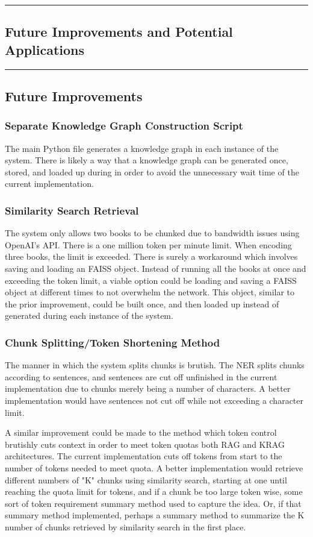 {\color{gray}\hrule}
\begin{center}
\section{Future Improvements and Potential Applications}
\bigskip
\end{center}
{\color{gray}\hrule}

\subsection{Future Improvements}
\subsubsection{Separate Knowledge Graph Construction Script}
The main Python file generates a knowledge graph in each instance of the system. There is likely a way that a knowledge graph can be generated once, stored, and loaded up during in order to avoid the unnecessary wait time of the current implementation.

\subsubsection{Similarity Search Retrieval}
The system only allows two books to be chunked due to bandwidth issues using OpenAI's API. There is a one million token per minute limit. When encoding three books, the limit is exceeded. There is surely a workaround which involves saving and loading an FAISS object. Instead of running all the books at once and exceeding the token limit, a viable option could be loading and saving a FAISS object at different times to not overwhelm the network. This object, similar to the prior improvement, could be built once, and then loaded up instead of generated during each instance of the system.

\subsubsection{Chunk Splitting/Token Shortening Method}
The manner in which the system splits chunks is brutish. The NER splits chunks according to sentences, and sentences are cut off unfinished in the current implementation due to chunks merely being a number of characters. A better implementation would have sentences not cut off while not exceeding a character limit.
\par

A similar improvement could be made to the method which token control brutishly cuts context in order to meet token quotas both RAG and KRAG architectures. The current implementation cuts off tokens from start to the number of tokens needed to meet quota. A better implementation would retrieve different numbers of "K" chunks using similarity search, starting at one until reaching the quota limit for tokens, and if a chunk be too large token wise, some sort of token requirement summary method used to capture the idea. Or, if that summary method implemented, perhaps a summary method to summarize the K number of chunks retrieved by similarity search in the first place.

